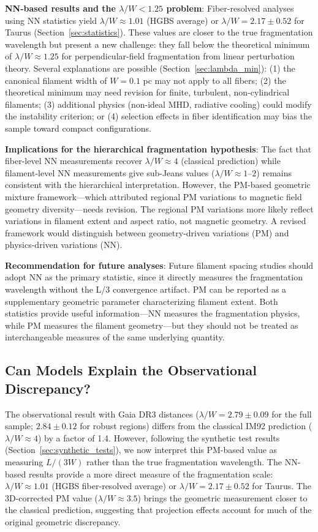 \documentclass[twoside,twocolumn]{mnras}
\begin{document}
\textbf{NN-based results and the $\lambda/W < 1.25$ problem}: Fiber-resolved analyses using NN statistics yield $\lambda/W \approx 1.01$ (HGBS average) or $\lambda/W = 2.17 \pm 0.52$ for Taurus (Section~\ref{sec:statistics}). These values are closer to the true fragmentation wavelength but present a new challenge: they fall below the theoretical minimum of $\lambda/W \approx 1.25$ for perpendicular-field fragmentation from linear perturbation theory. Several explanations are possible (Section~\ref{sec:lambda_min}): (1) the canonical filament width of $W = 0.1$ pc may not apply to all fibers; (2) the theoretical minimum may need revision for finite, turbulent, non-cylindrical filaments; (3) additional physics (non-ideal MHD, radiative cooling) could modify the instability criterion; or (4) selection effects in fiber identification may bias the sample toward compact configurations.

\textbf{Implications for the hierarchical fragmentation hypothesis}: The fact that fiber-level NN measurements recover $\lambda/W \approx 4$ (classical prediction) while filament-level NN measurements give sub-Jeans values ($\lambda/W \approx 1$--$2$) remains consistent with the hierarchical interpretation. However, the PM-based geometric mixture framework---which attributed regional PM variations to magnetic field geometry diversity---needs revision. The regional PM variations more likely reflect variations in filament extent and aspect ratio, not magnetic geometry. A revised framework would distinguish between geometry-driven variations (PM) and physics-driven variations (NN).

\textbf{Recommendation for future analyses}: Future filament spacing studies should adopt NN as the primary statistic, since it directly measures the fragmentation wavelength without the L/3 convergence artifact. PM can be reported as a supplementary geometric parameter characterizing filament extent. Both statistics provide useful information---NN measures the fragmentation physics, while PM measures the filament geometry---but they should not be treated as interchangeable measures of the same underlying quantity.

\subsection{Can Models Explain the Observational Discrepancy?}

The observational result with Gaia DR3 distances ($\lambda/W = 2.79 \pm 0.09$ for the full sample; $2.84 \pm 0.12$ for robust regions) differs from the classical IM92 prediction ($\lambda/W \approx 4$) by a factor of 1.4. However, following the synthetic test results (Section~\ref{sec:synthetic_tests}), we now interpret this PM-based value as measuring $L/(3W)$ rather than the true fragmentation wavelength. The NN-based results provide a more direct measure of the fragmentation scale: $\lambda/W \approx 1.01$ (HGBS fiber-resolved average) or $\lambda/W = 2.17 \pm 0.52$ for Taurus. The 3D-corrected PM value ($\lambda/W \approx 3.5$) brings the geometric measurement closer to the classical prediction, suggesting that projection effects account for much of the original geometric discrepancy.
\end{document}
